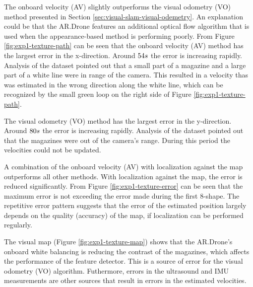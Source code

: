The onboard velocity (AV) slightly outperforms the visual odometry (VO) method presented in Section \ref{sec:visual-slam-visual-odemetry}.
An explanation could be that the AR.Drone features an additional optical flow algorithm that is used when the appearance-based method is performing poorly.
From Figure \ref{fig:exp1-texture-path} can be seen that the onboard velocity (AV) method has the largest error in the x-direction.
Around $54\begin{small}s\end{small}$ the error is increasing rapidly.
Analysis of the dataset pointed out that a small part of a magazine and a large part of a white line were in range of the camera.
This resulted in a velocity thas was estimated in the wrong direction along the white line, which can be recognized by the small green loop on the right side of Figure \ref{fig:exp1-texture-path}.

The visual odometry (VO) method has the largest error in the y-direction.
Around $80\begin{small}s\end{small}$ the error is increasing rapidly.
Analysis of the dataset pointed out that the magazines were out of the camera's range. During this period the velocities could not be updated.

A combination of the onboard velocity (AV) with localization against the map outperforms all other methods.
With localization against the map, the error is reduced significantly.
From Figure \ref{fig:exp1-texture-error} can be seen that the maximum error is not exceeding the error made during the first 8-shape.
The repetitive error pattern suggests that the error of the estimated position largely depends on the quality (accuracy) of the map, if localization can be performed regularly.

The visual map (Figure \ref{fig:exp1-texture-map}) shows that the AR.Drone's onboard white balancing is reducing the contrast of the magazines, which affects the performance of the feature detector.
This is a source of error for the visual odometry (VO) algorithm.
Futhermore, errors in the ultrasound and IMU measurements are other sources that result in errors in the estimated velocities.

